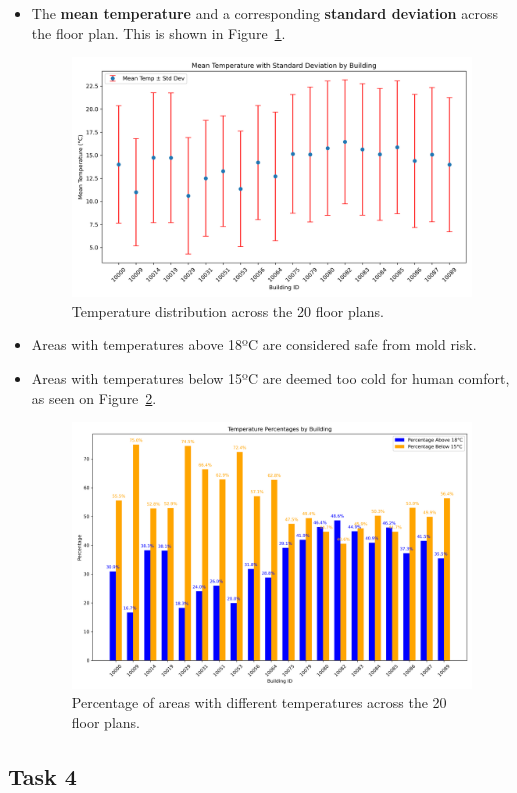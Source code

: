 \documentclass[a4paper,12pt]{article}
\begin{document}
\begin{itemize}
        \item The \textbf{mean temperature} and a corresponding \textbf{standard deviation} across the floor plan. This is shown in Figure~\ref{fig:temperature_distribution}.

        \begin{figure}[h!]
                \centering
                \includegraphics[width=1\textwidth]{Plots/mean_temp_with_std_dev.png}
                \caption{Temperature distribution across the 20 floor plans.}
                \label{fig:temperature_distribution}
        \end{figure}

        \item Areas with temperatures above 18ºC are considered safe from mold risk.
        \item Areas with temperatures below 15ºC are deemed too cold for human comfort, as seen on Figure~\ref{fig:temperature_distribution_precentage}.
        \begin{figure}[h!]
                \centering
                \includegraphics[width=1\textwidth]{Plots/temperature_percentages_by_building.png}
                \caption{Percentage of areas with different temperatures across the 20 floor plans.}
                \label{fig:temperature_distribution_precentage}
        \end{figure}

\end{itemize}


\subsection{Task 4}
\end{document}
